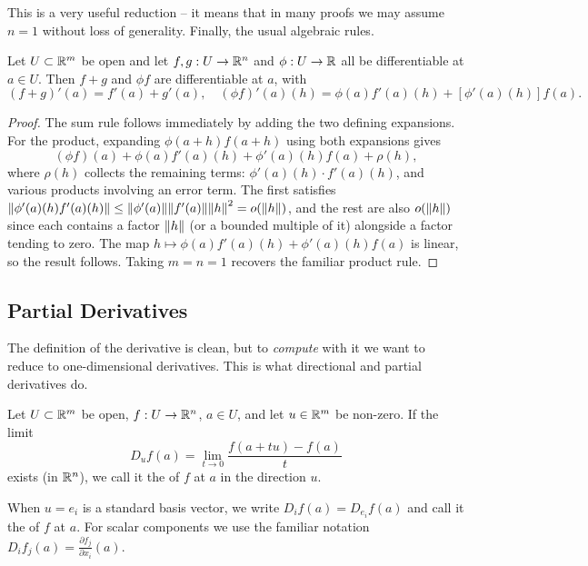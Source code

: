 \documentclass[a4paper]{scrartcl}
\begin{document}
This is a very useful reduction -- it means that in many proofs we may assume $n = 1$ without loss of generality. Finally, the usual algebraic rules.

\begin{proposition}
    Let $U \subset \mathbb{R}^m$ be open and let $f, g: U \rightarrow \mathbb{R}^n$ and $\phi: U \rightarrow \mathbb{R}$ all be differentiable at $a \in U$. Then $f + g$ and $\phi f$ are differentiable at $a$, with
    $$
    (f + g)'(a) = f'(a) + g'(a), \quad (\phi f)'(a)(h) = \phi(a) f'(a)(h) + \left[\phi'(a)(h)\right] f(a).
    $$
\end{proposition}
\begin{proof}
    The sum rule follows immediately by adding the two defining expansions. For the product, expanding $\phi(a + h)f(a + h)$ using both expansions gives
    $$
    (\phi f)(a) + \phi(a)f'(a)(h) + \phi'(a)(h)f(a) + \rho(h),
    $$
    where $\rho(h)$ collects the remaining terms: $\phi'(a)(h) \cdot f'(a)(h)$, and various products involving an error term. The first satisfies $\norm{\phi'(a)(h)f'(a)(h)} \leq \norm{\phi'(a)}\norm{f'(a)}\norm{h}^2 = o(\norm{h})$, and the rest are also $o(\norm{h})$ since each contains a factor $\norm{h}$ (or a bounded multiple of it) alongside a factor tending to zero. The map $h \mapsto \phi(a)f'(a)(h) + \phi'(a)(h)f(a)$ is linear, so the result follows. Taking $m = n = 1$ recovers the familiar product rule.
\end{proof}

\subsection{Partial Derivatives}

The definition of the derivative is clean, but to \emph{compute} with it we want to reduce to one-dimensional derivatives. This is what directional and partial derivatives do.

\begin{definition}
    Let $U \subset \mathbb{R}^m$ be open, $f: U \rightarrow \mathbb{R}^n$, $a \in U$, and let $u \in \mathbb{R}^m$ be non-zero. If the limit
    $$
    D_u f(a) = \lim_{t \to 0} \frac{f(a + tu) - f(a)}{t}
    $$
    exists (in $\mathbb{R}^n$), we call it the  of $f$ at $a$ in the direction $u$.

    When $u = e_i$ is a standard basis vector, we write $D_i f(a) = D_{e_i} f(a)$ and call it the  of $f$ at $a$. For scalar components we use the familiar notation $D_i f_j(a) = \frac{\partial f_j}{\partial x_i}(a)$.
\end{definition}
\end{document}
